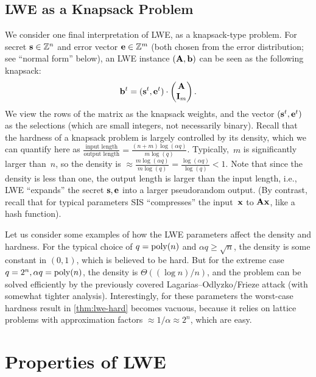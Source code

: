 \documentclass[11pt]{article}
\begin{document}
\subsection{LWE as a Knapsack Problem}
\label{sec:lwe-as-knapsack}

We consider one final interpretation of LWE, as a knapsack-type
problem. For secret $\mathbf{s} \in \mathbb{Z}^n$ and error vector $\mathbf{e} \in \mathbb{Z}^m$
(both chosen from the error distribution; see ``normal form'' below),
an LWE instance $(\mathbf{A}, \mathbf{b})$ can be seen as the following
knapsack:
\begin{align*}
  \mathbf{b}^{t} = (\mathbf{s}^t,  \mathbf{e}^t) \cdot
  \begin{pmatrix}
    \mathbf{A} \\ \mathbf{I}_m
  \end{pmatrix} .
\end{align*}
We view the rows of the matrix as the knapsack weights, and the vector
$(\mathbf{s}^t, \mathbf{e}^t)$ as the selections (which are small integers, not
necessarily binary). Recall that the hardness of a knapsack problem is
largely controlled by its density, which we can quantify here as
$\frac{\text{input length}}{\text{output length}} =
\frac{(n+m)\log(\alpha q)}{m \log(q)}$. Typically,~$m$ is
significantly larger than~$n$, so the density is
$\approx \frac{m\log(\alpha q)}{m\log(q)} = \frac{\log(\alpha
  q)}{\log(q)} < 1$. Note that since the density is less than one, the
output length is larger than the input length, i.e., LWE ``expands''
the secret $\mathbf{s},\mathbf{e}$ into a larger pseudorandom output. (By
contrast, recall that for typical parameters SIS ``compresses'' the
input~$\mathbf{x}$ to $\mathbf{A} \mathbf{x}$, like a hash function).

Let us consider some examples of how the LWE parameters affect the
density and hardness. For the typical choice of $q = \operatorname{poly}(n)$ and
$\alpha q \geq \sqrt{n}$, the density is some constant in $(0,1)$,
which is believed to be hard. But for the extreme case
$q = 2^n, \alpha q = \operatorname{poly}(n)$, the density is $\Theta((\log n)/n)$,
and the problem can be solved efficiently by the previously covered
Lagarias--Odlyzko/Frieze attack (with somewhat tighter analysis).
Interestingly, for these parameters the worst-case hardness result in
\cref{thm:lwe-hard} becomes vacuous, because it relies on lattice
problems with approximation factors $\approx 1/\alpha \approx 2^{n}$,
which are easy.

\section{Properties of LWE}
\label{sec:properties}
\end{document}
